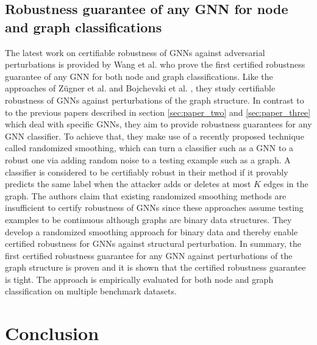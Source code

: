 \documentclass[a4paper,preprint]{sig-alternate}
\begin{document}
\subsection{Robustness guarantee of any GNN for node and graph classifications}
\label{sec:paper_four}

The latest work on certifiable robustness of GNNs against adversarial perturbations is provided by Wang et al. \cite{Wang_2020}
who prove the first certified robustness guarantee of any GNN for both node and graph classifications.
Like the approaches of Zügner et al. \cite{10.1145/3394486.3403217} and Bojchevski et al. \cite{bojchevski2019certifiable}, they study certifiable 
robustness of GNNs against perturbations of the graph structure. In contrast to to the previous papers described in section \ref{sec:paper_two}
and \ref{sec:paper_three} which deal with specific GNNs, they aim to provide robustness guarantees for any GNN classifier.
To achieve that, they make use of a recently proposed technique called randomized smoothing, which can turn a classifier such as a GNN to 
a robust one via adding random noise to a testing example such as a graph. A classifier is considered to be certifiably robust in their method
if it provably predicts the same label when the attacker adds or deletes at most $K$ edges in the graph.\newline
The authors claim that existing randomized smoothing methods are insufficient to certify robustness of GNNs since
these approaches assume testing examples to be continuous although graphs are binary data structures.
They develop a randomized smoothing approach for binary data and thereby enable certified robustness for GNNs against structural perturbation.\newline
In summary, the first certified robustness guarantee for any GNN against perturbations of the graph structure is proven
and it is shown that the certified robustness guarantee is tight.
The approach is empirically evaluated for both node and graph classification on multiple benchmark datasets.

\section{Conclusion}
\label{sec:conclusion}
\end{document}
